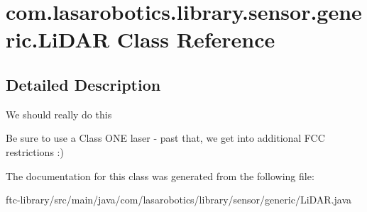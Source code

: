\hypertarget{classcom_1_1lasarobotics_1_1library_1_1sensor_1_1generic_1_1_li_d_a_r}{}\section{com.\+lasarobotics.\+library.\+sensor.\+generic.\+Li\+D\+A\+R Class Reference}
\label{classcom_1_1lasarobotics_1_1library_1_1sensor_1_1generic_1_1_li_d_a_r}


\subsection{Detailed Description}
We should really do this

Be sure to use a Class O\+N\+E laser -\/ past that, we get into additional F\+C\+C restrictions \+:) 

The documentation for this class was generated from the following file\+:\begin{DoxyCompactItemize}
\item 
ftc-\/library/src/main/java/com/lasarobotics/library/sensor/generic/Li\+D\+A\+R.\+java\end{DoxyCompactItemize}
